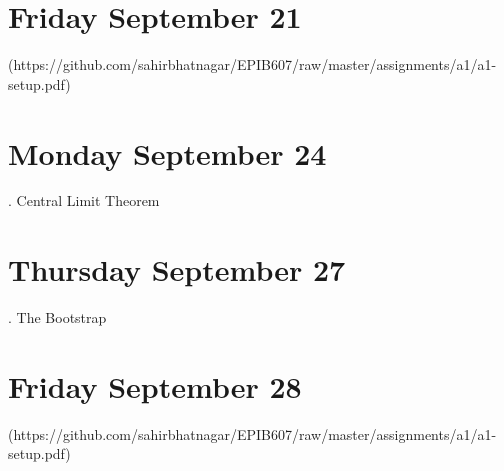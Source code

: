 \documentclass[]{book}
\let\originaltabular\tabular
\let\endoriginaltabular\endtabular
\renewenvironment{tabular}[1]{%
  \begingroup%
  \centering%
  \originaltabular{#1}}%
  {\endoriginaltabular\endgroup}
\theoremstyle{definition}
\theoremstyle{definition}
\theoremstyle{definition}
\theoremstyle{remark}
\begin{document}
\section{Friday September 21}\label{friday-september-21}

\begin{table}[H]
\centering
\begin{tabular}{l}
(https://github.com/sahirbhatnagar/EPIB607/raw/master/assignments/a1/a1-setup.pdf)\\
\hline
\end{tabular}
\end{table}

\section{Monday September 24}\label{monday-september-24}

\begin{table}[H]
\centering
\begin{tabular}{l}
. Central Limit Theorem\\
\hline
\end{tabular}
\end{table}

\section{Thursday September 27}\label{thursday-september-27}

\begin{table}[H]
\centering
\begin{tabular}{l}
. The Bootstrap\\
\hline
\end{tabular}
\end{table}

\section{Friday September 28}\label{friday-september-28}

\begin{table}[H]
\centering
\begin{tabular}{l}
(https://github.com/sahirbhatnagar/EPIB607/raw/master/assignments/a1/a1-setup.pdf)\\
\hline
\end{tabular}
\end{table}
\end{document}
